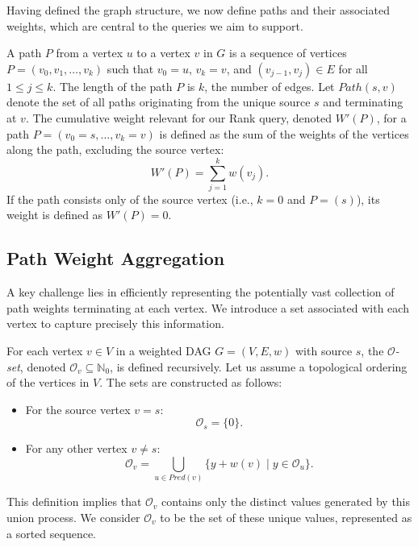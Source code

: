 Having defined the graph structure, we now define paths and their associated weights, which are central to the queries we aim to support.

\begin{definition}
    \label{def:paths_weights}
    A path $P$ from a vertex $u$ to a vertex $v$ in $G$ is a sequence of vertices $P = (v_0, v_1, \dots, v_k)$ such that $v_0 = u$, $v_k = v$, and $(v_{j-1}, v_j) \in E$ for all $1 \le j \le k$. The length of the path $P$ is $k$, the number of edges. Let $Path(s, v)$ denote the set of all paths originating from the unique source $s$ and terminating at $v$. The cumulative weight relevant for our Rank query, denoted $W'(P)$, for a path $P=(v_0=s, \dots, v_k=v)$ is defined as the sum of the weights of the vertices along the path, excluding the source vertex:
    \[ W'(P) = \sum_{j=1}^{k} w(v_j). \]
    If the path consists only of the source vertex (i.e., $k=0$ and $P=(s)$), its weight is defined as $W'(P)=0$.
\end{definition}


\subsection{Path Weight Aggregation}
\label{subsec:o_set_def}

A key challenge lies in efficiently representing the potentially vast collection of path weights terminating at each vertex. We introduce a set associated with each vertex to capture precisely this information.

\begin{definition}
    \label{def:o_set}
    For each vertex $v \in V$ in a weighted DAG $G=(V, E, w)$ with source $s$, the \emph{$\mathcal{O}$-set}, denoted $\mathcal{O}_v \subseteq \mathbb{N}_0$, is defined recursively. Let us assume a topological ordering of the vertices in $V$. The sets are constructed as follows:
    \begin{itemize}
        \item For the source vertex $v = s$:
              \[ \mathcal{O}_s = \{0\}. \]
        \item For any other vertex $v \neq s$:
              \[ \mathcal{O}_v = \bigcup_{u \in Pred(v)} \{ y + w(v) \mid y \in \mathcal{O}_u \}. \]
    \end{itemize}
\end{definition}
This definition implies that $\mathcal{O}_v$ contains only the distinct values generated by this union process. We consider $\mathcal{O}_v$ to be the set of these unique values, represented as a sorted sequence.


